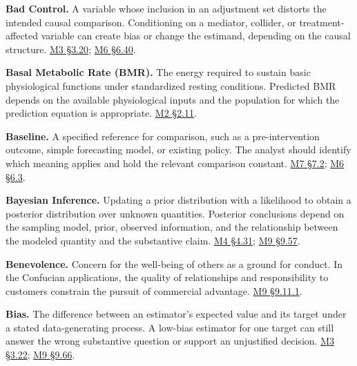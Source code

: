 \noindent\textbf{Bad Control.} A variable whose inclusion in an adjustment set
distorts the intended causal comparison. Conditioning on a mediator,
collider, or treatment-affected variable can create bias or change the
estimand, depending on the causal structure.
\href{Marketing_Analytics_Lecture_Notes.pdf\#M03-a-control-variable-needs-a-causal-role}{M3
§3.20};
\href{Marketing_Analytics_Lecture_Notes.pdf\#M06-treatment-affected-covariates-in-a-panel}{M6
§6.40}.

\noindent\textbf{Basal Metabolic Rate (BMR).} The energy required to sustain
basic physiological functions under standardized resting conditions.
Predicted BMR depends on the available physiological inputs and the
population for which the prediction equation is appropriate.
\href{Marketing_Analytics_Lecture_Notes.pdf\#M02-mhealth-nutrition-knowledge-and-sample-restrictions}{M2
§2.11}.

\noindent\textbf{Baseline.} A specified reference for comparison, such as a
pre-intervention outcome, simple forecasting model, or existing policy.
The analyst should identify which meaning applies and hold the relevant
comparison constant.
\href{Marketing_Analytics_Lecture_Notes.pdf\#M07-baselines-loss-functions-and-regularization}{M7
§7.2};
\href{Marketing_Analytics_Lecture_Notes.pdf\#M06-designing-an-experiment-around-the-decision}{M6
§6.3}.

\noindent\textbf{Bayesian Inference.} Updating a prior distribution with a
likelihood to obtain a posterior distribution over unknown quantities.
Posterior conclusions depend on the sampling model, prior, observed
information, and the relationship between the modeled quantity and the
substantive claim.
\href{Marketing_Analytics_Lecture_Notes.pdf\#M04-released-retail-data-integrated-heterogeneity-and-competing-explanations}{M4
§4.31};
\hyperref[M09-heterogeneity-and-the-interpretation-of-consumer-harm]{M9
§9.57}.

\noindent\textbf{Benevolence.} Concern for the well-being of others as a ground
for conduct. In the Confucian applications, the quality of relationships
and responsibility to customers constrain the pursuit of commercial
advantage.
\hyperref[M09-righteousness-and-profit]{M9
§9.11.1}.

\noindent\textbf{Bias.} The difference between an estimator's expected value and
its target under a stated data-generating process. A low-bias estimator
for one target can still answer the wrong substantive question or
support an unjustified decision.
\href{Marketing_Analytics_Lecture_Notes.pdf\#M03-unbiased-estimation-and-the-consequences-of-error}{M3
§3.22};
\hyperref[M09-statistical-virtues-and-ontological-laziness]{M9
§9.66}.

